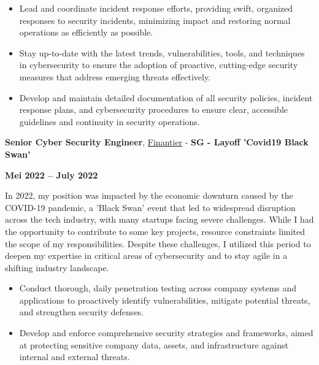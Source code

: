 \documentclass[10pt, letterpaper]{article}
\newenvironment{highlights}{
    \begin{itemize}[
        topsep=0.10 cm,
        parsep=0.10 cm,
        partopsep=0pt,
        itemsep=0pt,
        leftmargin=0 cm + 10pt
    ]
}{
    \end{itemize}
} %
\newenvironment{twocolentry}[2][]{
    \onecolentry
    \def\secondColumn{#2}
    \setcolumnwidth{\fill, 4.5 cm}
    \begin{paracol}{2}
}{
    \switchcolumn \raggedleft \secondColumn
    \end{paracol}
    \endonecolentry
} %
\let\hrefWithoutArrow\href
\begin{document}
\begin{justify}
\begin{highlights}
             \item Lead and coordinate incident response efforts, providing swift, organized responses to security incidents, minimizing impact and restoring normal operations as efficiently as possible.
             
             \item Stay up-to-date with the latest trends, vulnerabilities, tools, and techniques in cybersecurity to ensure the adoption of proactive, cutting-edge security measures that address emerging threats effectively.
             
             \item Develop and maintain detailed documentation of all security policies, incident response plans, and cybersecurity procedures to ensure clear, accessible guidelines and continuity in security operations.
            \end{highlights}
        \end{justify}
       	\newpage
       	
       	
       	\begin{twocolentry}{\textbf{Mei 2022 – July 2022}}
       		\textbf{Senior Cyber Security Engineer}, \hrefWithoutArrow{https://www.instagram.com/finantierco/}{Finantier} - \textbf{SG - Layoff 'Covid19 Black Swan'}
       	\end{twocolentry}
	
		\vspace{0.10 cm}
		\begin{justify}
			In 2022, my position was impacted by the economic downturn caused by the COVID-19 pandemic, a 'Black Swan' event that led to widespread disruption across the tech industry, with many startups facing severe challenges. While I had the opportunity to contribute to some key projects, resource constraints limited the scope of my responsibilities. Despite these challenges, I utilized this period to deepen my expertise in critical areas of cybersecurity and to stay agile in a shifting industry landscape.
			\begin{highlights}
				\item Conduct thorough, daily penetration testing across company systems and applications to proactively identify vulnerabilities, mitigate potential threats, and strengthen security defenses.
			
				
				\item Develop and enforce comprehensive security strategies and frameworks, aimed at protecting sensitive company data, assets, and infrastructure against internal and external threats.
			\end{highlights}
		\end{justify}
		
\end{document}
